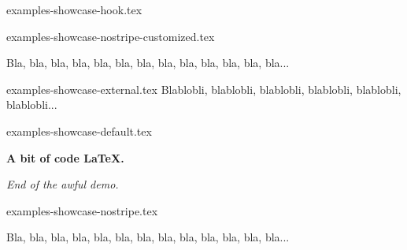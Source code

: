 \begin{filecontents*}[overwrite]{examples-showcase-hook.tex}
\begin{tdocshowcase}
\end{tdocshowcase}
\end{filecontents*}


\begin{filecontents*}[overwrite]{examples-showcase-nostripe-customized.tex}
\begin{tdocshowcase}[nostripe,
                     before     = My beginning,
                     after      = My end,
                     col-stripe = green,
                     col-text   = purple]
    Bla, bla, bla, bla, bla, bla, bla, bla, bla, bla, bla, bla, bla...
\end{tdocshowcase}
\end{filecontents*}


\begin{filecontents*}[overwrite]{examples-showcase-external.tex}
Blablobli, blablobli, blablobli, blablobli, blablobli, blablobli...
\end{filecontents*}


\begin{filecontents*}[overwrite]{examples-showcase-default.tex}
\begin{tdocshowcase}
    \bfseries A bit of code \LaTeX.

    \bigskip

    \emph{\large End of the awful demo.}
\end{tdocshowcase}
\end{filecontents*}


\begin{filecontents*}[overwrite]{examples-showcase-nostripe.tex}
\begin{tdocshowcase}[nostripe]
    Bla, bla, bla, bla, bla, bla, bla, bla, bla, bla, bla, bla, bla...
\end{tdocshowcase}
\end{filecontents*}



\documentclass{tutodoc}

\usepackage[T1]{fontenc}

\usepackage[english]{babel, varioref}

\usepackage{enumitem}
\usepackage{fmtcount}

\usepackage{multicol}
\usepackage{tasks}

